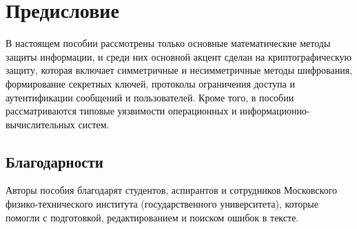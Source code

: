 \chapter*{Предисловие}

В настоящем пособии рассмотрены только основные математические методы защиты информации, и среди них основной акцент сделан на криптографическую защиту, которая включает симметричные и несимметричные методы шифрования, формирование секретных ключей, протоколы ограничения доступа и аутентификации сообщений и пользователей. Кроме того, в пособии рассматриваются типовые уязвимости операционных и информационно-вычислительных систем.

\section*{Благодарности}
Авторы пособия благодарят студентов, аспирантов и сотрудников Московского физико-технического института (государственного университета), которые помогли с подготовкой, редактированием и поиском ошибок в тексте.


